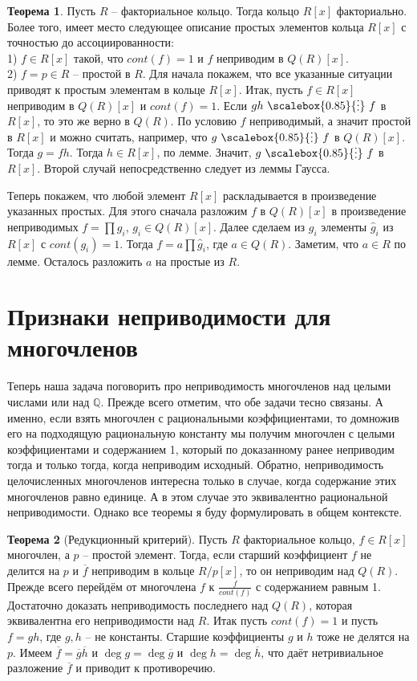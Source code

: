 \documentclass[12pt,a4paper,oneside]{book}
\theoremstyle{definition}
\newtheorem{thm}{\color{red!40!black}Теорема}
\newcommand{\ovl}{\overline}
\newcommand{\di}{\mathop{\,\scalebox{0.85}{\raisebox{-1.2pt}[0.5\height]{\vdots}}\,}}
\newcommand{\Q}{\mathbb Q}
\def\thrm{\begin{thm}}
\def\ethrm{\end{thm}}
\begin{document}
\thrm Пусть $R$ -- факториальное кольцо. Тогда кольцо $R[x]$ факториально. Более того, имеет место следующее описание простых элементов кольца $R[x]$ с точностью до ассоциированности:\\
1) $f\in R[x]$ такой, что $cont(f)=1$ и $f$ неприводим в $Q(R)[x]$.\\
2) $f=p \in R$ -- простой в $R$.
\proof 
Для начала покажем, что все указанные ситуации приводят к простым элементам в кольце $R[x]$.
Итак, пусть $f \in R[x]$ неприводим в $Q(R)[x]$ и $cont(f)=1$. Если $gh\di f$ в $R[x]$, то это же верно в $Q(R)$. По условию $f$ неприводимый, а значит простой в $R[x]$ и можно считать, например, что $g\di f$ в $Q(R)[x]$. Тогда $g= fh$. Тогда $h\in R[x]$, по лемме. Значит, $g \di f$ в $R[x]$. Второй случай непосредственно следует из леммы Гаусса.


Теперь покажем, что любой элемент $R[x]$ раскладывается в произведение указанных простых. Для этого сначала разложим $f$ в $Q(R)[x]$ в произведение неприводимых $f=\prod g_i$, $g_i \in Q(R)[x]$. Далее сделаем из $g_i$ элементы $\hat{g}_i$ из $R[x]$ с $cont(g_i)=1$. Тогда $f=a\prod \hat{g}_i$, где $a\in Q(R)$. Заметим, что $a\in R$ по лемме. Осталось разложить $a$ на простые из $R$.
\endproof
\ethrm








\section{Признаки неприводимости для многочленов}

Теперь наша задача поговорить про неприводимость многочленов над целыми числами или над $\Q$. 
Прежде всего отметим, что обе задачи тесно связаны. А именно, если взять многочлен с рациональными коэффициентами, то домножив его на подходящую рациональную константу мы получим многочлен с целыми коэффициентами и содержанием 1, который по доказанному ранее неприводим тогда и только тогда, когда неприводим исходный. Обратно, неприводимость целочисленных многочленов интересна только в случае, когда содержание этих многочленов равно единице. А в этом случае это эквивалентно рациональной неприводимости. Однако все теоремы я буду формулировать в общем контексте.



\thrm[Редукционный критерий] Пусть $R$ факториальное кольцо, $f \in  R[x]$ многочлен, а $p$ -- простой элемент. Тогда, если старший коэффициент $f$ не делится на $p$ и $\ovl{f}$ неприводим в кольце $R/p[x]$, то он неприводим над $Q(R)$. 
\proof Прежде всего перейдём от многочлена $f$ к $\frac{f}{cont(f)}$ с содержанием равным 1. Достаточно доказать неприводимость  последнего над $Q(R)$, которая эквивалентна его неприводимости над $R$. Итак пусть $cont(f)=1$ и пусть $f=gh$, где $g,h$ --  не константы. Старшие коэффициенты $g$ и $h$ тоже не делятся на $p$. Имеем $\ovl{f}= \ovl{g}\ovl{h}$ и $\deg g = \deg \ovl{g}$ и $\deg h = \deg \ovl{h}$, что даёт нетривиальное разложение $\ovl{f}$ и приводит к противоречию.
\endproof
\ethrm
\end{document}
